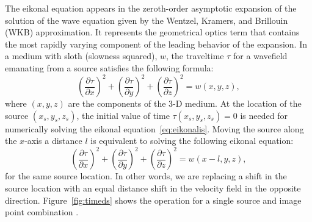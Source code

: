 The eikonal equation appears in the zeroth-order asymptotic expansion
of the solution of the wave equation given by the Wentzel, Kramers,
and Brillouin (WKB) approximation. It represents
the geometrical optics term that contains the most rapidly varying
component of the leading behavior of the expansion. In a medium with
sloth (slowness squared), $w$, the traveltime $\tau$ for a wavefield
emanating from a source satisfies the following formula:
\begin{equation}
\left(\frac{\partial \tau}{\partial x}\right)^2 + 
\left(\frac{\partial \tau}{\partial y}\right)^2+
\left(\frac{\partial \tau}{\partial z}\right)^2 =w(x,y,z),
\label{eq:eikonalis}
\end{equation}
where $(x,y,z)$ are the components of the 3-D medium. At the location
of the source $(x_s,y_s,z_s)$, the initial value of time
$\tau(x_s,y_s,z_s)=0$ is needed for numerically solving the eikonal
equation~\ref{eq:eikonalis}.  Moving the source along the $x$-axis a
distance $l$ is equivalent to solving the following eikonal equation:
\begin{equation}
\left(\frac{\partial \tau}{\partial x}\right)^2 + 
\left(\frac{\partial \tau}{\partial y}\right)^2+
\left(\frac{\partial \tau}{\partial z}\right)^2 =w(x-l,y,z),
\label{eq:eikonalds}
\end{equation}
for the same source location. In other words, we are replacing a shift in the source location with an equal distance shift in the velocity field
in the opposite direction.
Figure~\ref{fig:timeds} shows the operation for a single source and image point combination 
.


